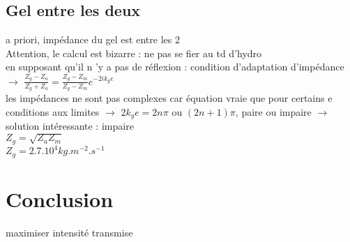 \subsection{Gel entre les deux}
a priori, impédance du gel est entre les 2 \\
Attention, le calcul est bizarre : ne pas se fier au td d'hydro \\
en supposant qu'il n 'y a pas de réflexion :
condition d'adaptation d'impédance $\rightarrow$ $\frac{Z_g-Z_a}{Z_g+Z_a}=\frac{Z_g-Z_m}{Z_g-Z_m} e^{-2 i k_g e}$ \\
les impédances ne sont pas complexes car équation vraie que pour certains e \\

conditions aux limites $\rightarrow$  $2 k_g e=2n\pi$ ou $(2n+1) \pi$, paire ou impaire $\rightarrow$ solution intéressante : impaire \\
$Z_g=\sqrt{Z_a Z_m}$ \\
$Z_g=2.7 .10^4 kg.m^{-2}.s^{-1}$

\section*{Conclusion}
maximiser intensité transmise \\

